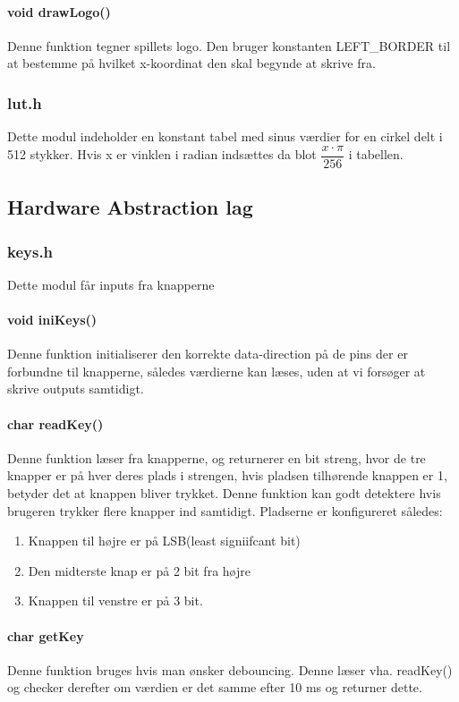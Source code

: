 \paragraph{void drawLogo()}
Denne funktion tegner spillets logo. Den bruger konstanten LEFT\_BORDER til at bestemme på hvilket x-koordinat den skal begynde at skrive fra.
\subsubsection{lut.h}
Dette modul indeholder en konstant tabel med sinus værdier for en cirkel delt i 512 stykker. Hvis x er vinklen i radian indsættes da blot $\dfrac{x\cdot \pi}{256}$ i tabellen.
\subsection{Hardware Abstraction lag}
\subsubsection{keys.h}
Dette modul får inputs fra knapperne 
\paragraph{void iniKeys()}
Denne funktion initialiserer den korrekte data-direction på de pins der er forbundne til knapperne, således værdierne kan læses, uden at vi forsøger at skrive outputs samtidigt.

\paragraph{char readKey()}
Denne funktion læser fra knapperne, og returnerer en bit streng, hvor de tre knapper er på hver deres plads i strengen, hvis pladsen tilhørende knappen er 1, betyder det at knappen bliver trykket. Denne funktion kan godt detektere hvis brugeren trykker flere knapper ind samtidigt. Pladserne er konfigureret således:
\begin{enumerate}
\item Knappen til højre er på LSB(least signiifcant bit)
\item Den midterste knap er på 2 bit fra højre
\item Knappen til venstre er på 3 bit.
\end{enumerate}

\paragraph{char getKey}
Denne funktion bruges hvis man ønsker debouncing. Denne læser vha. readKey() og checker derefter om værdien er det samme efter 10 ms og returner dette.

